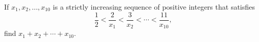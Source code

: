 If $x_1,x_2,\dots,x_{10}$ is a strictly increasing sequence of positive integers that satisfies
\[\dfrac12<\dfrac2{x_1}<\dfrac3{x_2}<\cdots<\dfrac{11}{x_{10}},\]
find $x_1+x_2+\cdots+x_{10}$.
